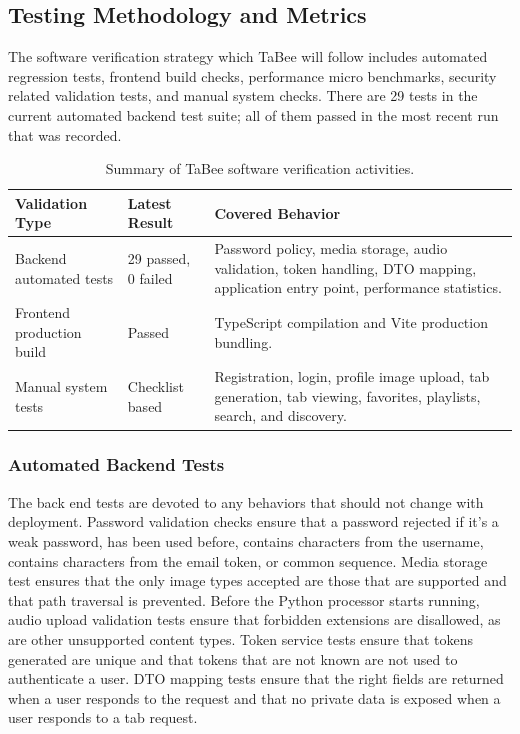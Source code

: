 \documentclass[a4paper, 12pt, titlepage]{article}
\begin{document}
\subsection{Testing Methodology and Metrics}

The software verification strategy which TaBee will follow includes automated regression tests, frontend build checks, performance micro benchmarks, security related validation tests, and manual system checks. There are 29 tests in the current automated backend test suite; all of them passed in the most recent run that was recorded.

\begin{table}[H]
    \centering
    \begin{tabular}{|p{}|p{}|p{}|}
        \hline
        \textbf{Validation Type} & \textbf{Latest Result} & \textbf{Covered Behavior} \\
        \hline
        Backend automated tests & 29 passed, 0 failed & Password policy, media storage, audio validation, token handling, DTO mapping, application entry point, performance statistics. \\
        \hline
        Frontend production build & Passed & TypeScript compilation and Vite production bundling. \\
        \hline
        Manual system tests & Checklist based & Registration, login, profile image upload, tab generation, tab viewing, favorites, playlists, search, and discovery. \\
        \hline
    \end{tabular}
    \caption{Summary of TaBee software verification activities.}
    \label{tab:tabee_verification_summary}
\end{table}

\subsubsection{Automated Backend Tests}

The back end tests are devoted to any behaviors that should not change with deployment. Password validation checks ensure that a password rejected if it's a weak password, has been used before, contains characters from the username, contains characters from the email token, or common sequence. Media storage test ensures that the only image types accepted are those that are supported and that path traversal is prevented. Before the Python processor starts running, audio upload validation tests ensure that forbidden extensions are disallowed, as are other unsupported content types. Token service tests ensure that tokens generated are unique and that tokens that are not known are not used to authenticate a user. DTO mapping tests ensure that the right fields are returned when a user responds to the request and that no private data is exposed when a user responds to a tab request.
\end{document}
